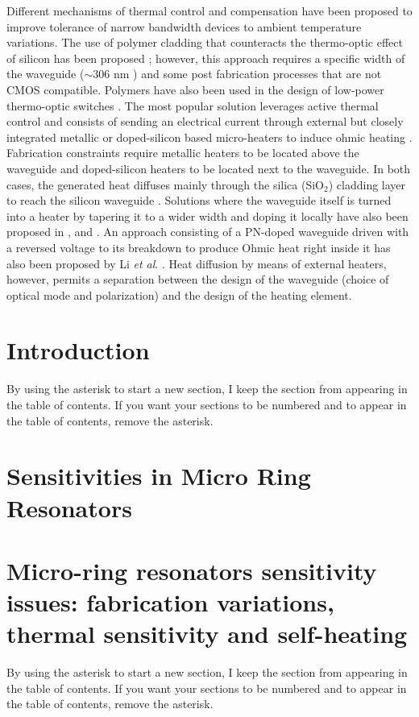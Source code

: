 Different mechanisms of thermal control and compensation have been proposed to improve tolerance of narrow bandwidth devices to ambient temperature variations. The use of polymer cladding that counteracts the thermo-optic effect of silicon has been proposed \cite{guha2013athermal}; however, this approach requires a specific width of the waveguide ($\sim$306 nm \cite{padmaraju2014resolving}) and some post fabrication processes that are not CMOS compatible. Polymers have also been used in the design of low-power thermo-optic switches \cite{niu2017optimized}. The most popular solution leverages active thermal control and consists of sending an electrical current through external but closely integrated metallic \cite{atabaki2010optimization} or doped-silicon based micro-heaters to induce ohmic heating \cite{pintus2016optimization}. Fabrication constraints require metallic heaters to be located above the waveguide and doped-silicon heaters to be located next to the waveguide. In both cases, the generated heat diffuses mainly through the silica (SiO$_2$) cladding layer to reach the silicon waveguide \cite{masood2013comparison,niu2017optimized}. Solutions where the waveguide itself is turned into a heater by tapering it to a wider width and doping it locally have also been proposed in \cite{watts2009adiabatic, derose2011low}, and \cite{watts2013adiabatic}. An approach consisting of a PN-doped waveguide driven with a reversed voltage to its breakdown to produce Ohmic heat right inside it has also been proposed by Li \textit{et al}. \cite{li2014fast}. Heat diffusion by means of external heaters, however, permits a separation between the design of the waveguide (choice of optical mode and polarization) and the design of the heating element.


\section{Introduction}

By using the asterisk to start a new section, I keep the section from appearing in the table of contents.
If you want your sections to be numbered and to appear in the table of contents, remove the asterisk.
\section{Sensitivities in Micro Ring Resonators}
\section{Micro-ring resonators sensitivity issues: fabrication variations, thermal sensitivity and self-heating}

By using the asterisk to start a new section, I keep the section from appearing in the table of contents.
If you want your sections to be numbered and to appear in the table of contents, remove the asterisk.

